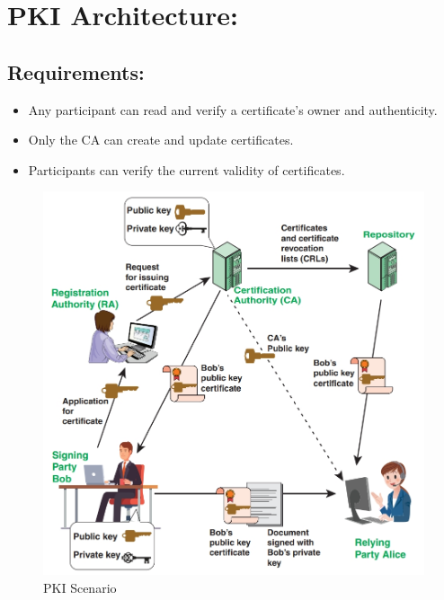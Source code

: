 \section{PKI Architecture:}

\subsection{Requirements:}
\begin{itemize}
    \item Any participant can read and verify a certificate’s owner and authenticity.
    \item Only the CA can create and update certificates.
    \item Participants can verify the current validity of certificates.
\end{itemize}
\begin{figure}
    \centering
    \includegraphics[width=1\linewidth]{Data_Privacy_and_Cryptography/Figures/PKI Scenario.jpeg}
    \caption{PKI Scenario}
    \label{fig:enter-label}
\end{figure}
